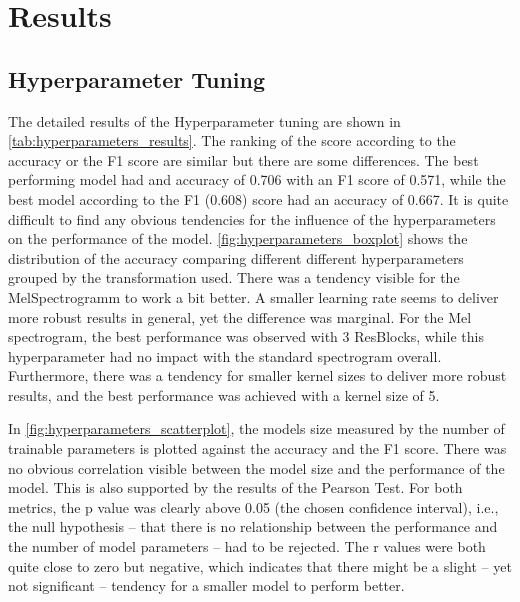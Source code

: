 


\section{Results}
\label{results}

\subsection{Hyperparameter Tuning}%

The detailed results of the Hyperparameter tuning are shown in \autoref{tab:hyperparameters_results}.
The ranking of the score according to the accuracy or the F1 score are similar but there are some differences.
The best performing model had and accuracy of 0.706 with an F1 score of 0.571, while 
the best model according to the F1 (0.608) score had an accuracy of 0.667.
It is quite difficult to find any obvious tendencies for the influence of the hyperparameters on the performance of the model.
\autoref{fig:hyperparameters_boxplot} shows the distribution of the accuracy comparing different different hyperparameters
grouped by the transformation used. There was a tendency visible for the MelSpectrogramm to work a bit better.
A smaller learning rate seems to deliver more robust results in general, yet the difference was marginal.
For the Mel spectrogram, the best performance was observed with 3 ResBlocks, while this hyperparameter had no impact with the standard spectrogram overall.
Furthermore, there was a tendency for smaller kernel sizes to deliver more robust results,
and the best performance was achieved with a kernel size of 5.

In \autoref{fig:hyperparameters_scatterplot}, the
models size measured by the number of trainable parameters is plotted against the accuracy and the F1 score.
There was no obvious correlation visible between the model size and the performance of the model.
This is also supported by the results of the Pearson Test. For both metrics, the p value was clearly above 0.05 
(the chosen confidence interval), i.e., the null hypothesis -- that there is no relationship between the performance and the number of model parameters -- had to be rejected.
The r values were both quite close to zero but negative, which indicates that there might be a slight -- yet not significant -- tendency for a smaller model to perform better.

